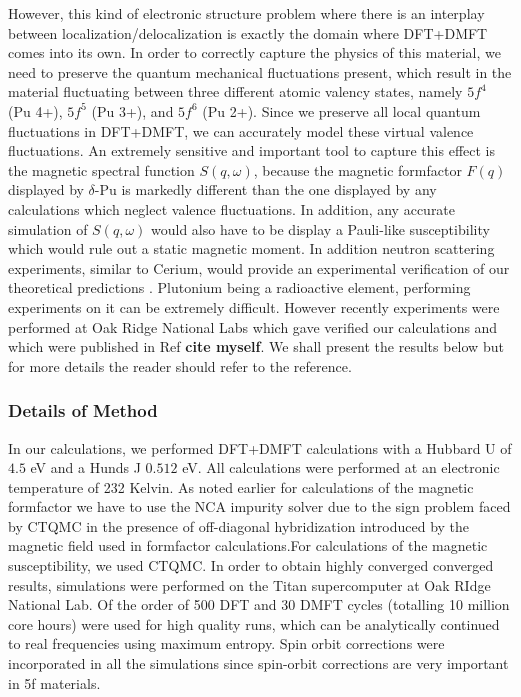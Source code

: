 \documentclass[10pt]{ruthesis}
\begin{document}
{However, this kind of electronic structure problem where there is an interplay between localization/delocalization is exactly the domain where DFT+DMFT comes into its own. In order to correctly capture the physics of this material, we need to preserve the quantum mechanical fluctuations present, which result in the material fluctuating between three different atomic valency states, namely $5f^4$ (Pu 4+), $5f^5$ (Pu 3+), and $5f^6$ (Pu 2+). Since we preserve all local quantum fluctuations in DFT+DMFT, we can accurately model these virtual valence fluctuations. An extremely sensitive and important tool to capture this effect is the magnetic spectral function $S(q,\omega)$, because the magnetic formfactor $F(q)$ displayed by $\delta$-Pu is markedly different than the one displayed by any calculations which neglect valence fluctuations. In addition, any accurate simulation of $S(q,\omega)$ would also have to be display a Pauli-like susceptibility which would rule out a static magnetic moment. In addition neutron scattering experiments, similar to Cerium, would provide an experimental verification of our theoretical predictions  . Plutonium being a radioactive element, performing experiments on it can be extremely difficult. However recently experiments were performed at Oak Ridge National Labs which gave verified our calculations and which were published in Ref \textbf{cite myself}. We shall present the results below but for more details the reader should refer to the reference.


\subsubsection{Details of Method}

In our calculations, we performed  DFT+DMFT calculations with a Hubbard U of $4.5$ eV and a Hunds J $0.512$ eV. All calculations were performed at an electronic temperature of 232 Kelvin. As noted earlier for calculations of the magnetic formfactor we have to use the NCA impurity solver due to the sign problem faced by CTQMC in the presence of off-diagonal hybridization introduced by the magnetic field used in formfactor calculations.For calculations of the magnetic susceptibility, we used CTQMC. In order to obtain highly converged converged results, simulations were performed on the Titan supercomputer at Oak RIdge National Lab. Of the order of 500 DFT and 30 DMFT cycles (totalling 10 million core hours) were used for high quality runs, which can be analytically continued to real frequencies using maximum entropy. Spin orbit corrections were incorporated in all the simulations since spin-orbit corrections are very important in 5f materials.

}
\end{document}
